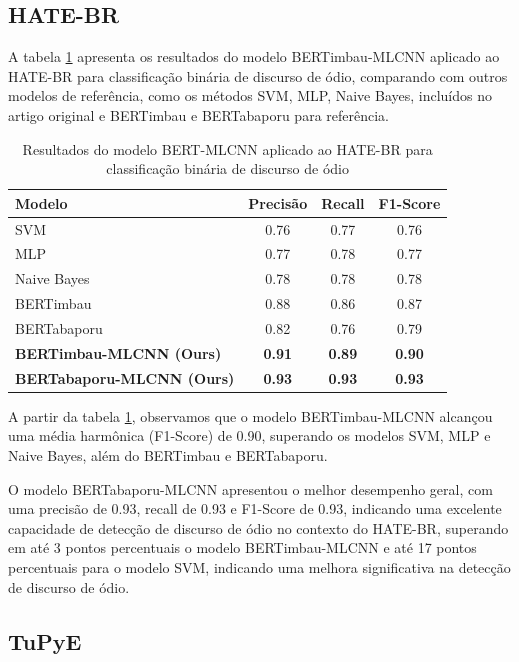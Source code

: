 \documentclass[sigconf,nonacm]{acmart}
\begin{document}
\subsection{HATE-BR}
A tabela \ref{tab:model_comparison_hatebr} apresenta os resultados do modelo BERTimbau-MLCNN aplicado ao HATE-BR para classificação binária de discurso de ódio,
comparando com outros modelos de referência, como os métodos SVM, MLP, Naive Bayes, incluídos no artigo original e BERTimbau e BERTabaporu para referência.

\begin{table}[H]
  \centering
  \begin{tabular}{lccc}
    \toprule
    \textbf{Modelo} & \textbf{Precisão} & \textbf{Recall} & \textbf{F1-Score} \\
    \midrule
    SVM & 0.76 & 0.77 & 0.76 \\
    MLP & 0.77 & 0.78 & 0.77 \\
    Naive Bayes & 0.78 & 0.78 & 0.78 \\
    BERTimbau & 0.88 & 0.86 & 0.87 \\
    BERTabaporu & 0.82 & 0.76 & 0.79 \\
    \textbf{BERTimbau-MLCNN (Ours)} & \textbf{0.91} & \textbf{0.89} & \textbf{0.90} \\
    \textbf{BERTabaporu-MLCNN (Ours)} & \textbf{0.93} & \textbf{0.93} & \textbf{0.93} \\
    \bottomrule
  \end{tabular}
  \caption{Resultados do modelo BERT-MLCNN aplicado ao HATE-BR para classificação binária de discurso de ódio}
  \label{tab:model_comparison_hatebr}
\end{table}

A partir da tabela \ref{tab:model_comparison_hatebr}, observamos que o modelo BERTimbau-MLCNN alcançou uma média harmônica (F1-Score) de 0.90,
superando os modelos SVM, MLP e Naive Bayes, além do BERTimbau e BERTabaporu.

O modelo BERTabaporu-MLCNN apresentou o melhor desempenho geral, com uma precisão de 0.93, recall de 0.93 e F1-Score de 0.93,
indicando uma excelente capacidade de detecção de discurso de ódio no contexto do HATE-BR, superando em até 3 pontos percentuais 
o modelo BERTimbau-MLCNN e até 17 pontos percentuais para o modelo SVM, indicando uma melhora significativa na detecção de discurso de ódio.

\subsection{TuPyE}
\end{document}
